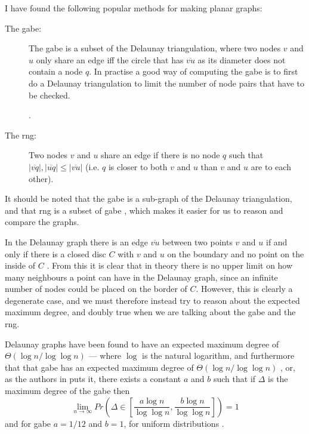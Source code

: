 I have found the following popular methods for making planar graphs:
\begin{description}
\item[The \ac{gabe}:] The \ac{gabe} is a subset of the Delaunay triangulation, where two nodes $v$ and $u$ only share an edge iff the circle that has $\overline{vu}$ as its diameter does not contain a node $q$. In practise a good way of computing the \ac{gabe} is to first do a Delaunay triangulation to limit the number of node pairs that have to be checked.

\cite{gpsr, gopher}. 
\item[The \ac{rng}:] Two nodes $v$ and $u$ share an edge if there is no node $q$ such that $|\overline{vq}|, |\overline{uq}| \leq |\overline{vu}|$ (i.e. $q$ is closer to both $v$ and $u$ than $v$ and $u$ are to each other). \cite{gpsr, RNG}
\end{description}

\label{del_gabe_rng_neigh}It should be noted that the \ac{gabe} is a sub-graph of the Delaunay triangulation\cite{GGExpected}, and that \ac{rng} is a subset of \ac{gabe} \cite{GGExpected}, which makes it easier for us to reason and compare the graphs.


In the Delaunay graph there is an edge $\overline{vu}$ between two points $v$ and $u$ if and only if there is a closed disc $C$ with $v$ and $u$ on the boundary and no point on the inside of $C$ \cite{CompuGeo}. From this it is clear that in theory there is no upper limit on how many neighbours a point can have in the Delaunay graph, since an infinite number of nodes could be placed on the border of $C$. However, this is clearly a degenerate case, and we must therefore instead try to reason about the expected maximum degree, and doubly true when we are talking about the \ac{gabe} and the \ac{rng}.

Delaunay graphs have been found to have an expected maximum degree of $\Theta(\log n / \log \log n)$ \cite{delExpected} --- where $\log$ is the natural logarithm, and furthermore that that \ac{gabe} has an expected maximum degree of $\Theta(\log n / \log \log n)$ \cite{GGExpected}, or, as the authors in \cite{GGExpected} puts it, there exists a constant $a$ and $b$ such that if $\Delta$ is the maximum degree of the \ac{gabe} then 
$$
\lim_{n \rightarrow \infty} Pr\left({\Delta \in \left[\frac{a\log n}{\log \log n}, \frac{b\log n}{\log \log n}\right]}\right) = 1
$$
and for \ac{gabe} $a = 1/12$ and $b = 1$, for uniform distributions \cite{GGExpected}.

